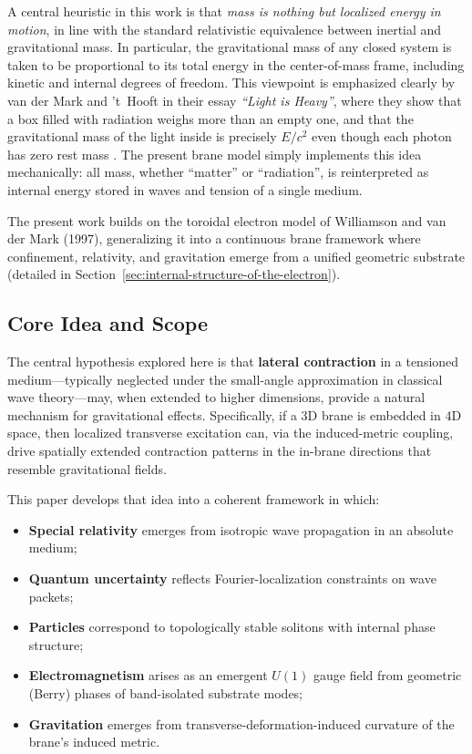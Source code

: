 A central heuristic in this work is that \emph{mass is nothing but
localized energy in motion}, in line with the standard relativistic
equivalence between inertial and gravitational mass. In particular, the
gravitational mass of any closed system is taken to be proportional to
its total energy in the center-of-mass frame, including kinetic and
internal degrees of freedom. This viewpoint is emphasized clearly by
van der Mark and 't~Hooft in their essay \emph{``Light is Heavy''},
where they show that a box filled with radiation weighs more than an
empty one, and that the gravitational mass of the light inside is
precisely $E/c^2$ even though each photon has zero rest mass
\cite{vanderMark2000LightHeavy}. The present brane model simply
implements this idea mechanically: all mass, whether ``matter'' or
``radiation'', is reinterpreted as internal energy stored in waves and
tension of a single medium.

The present work builds on the toroidal electron model of Williamson and van der Mark (1997), generalizing it into a continuous brane framework where confinement, relativity, and gravitation emerge from a unified geometric substrate (detailed in Section~\ref{sec:internal-structure-of-the-electron}).

\subsection{Core Idea and Scope}\label{core-idea}

The central hypothesis explored here is that \textbf{lateral contraction} in a tensioned medium—typically neglected under the small-angle approximation in classical wave theory—may, when extended to higher dimensions, provide a natural mechanism for gravitational effects. Specifically, if a 3D brane is embedded in 4D space, then localized transverse excitation can, via the induced-metric coupling, drive spatially extended contraction patterns in the in-brane directions that resemble gravitational fields.

This paper develops that idea into a coherent framework in which:
\begin{itemize}
\item \textbf{Special relativity} emerges from isotropic wave propagation in an absolute medium;
\item \textbf{Quantum uncertainty} reflects Fourier-localization constraints on wave packets;
\item \textbf{Particles} correspond to topologically stable solitons with internal phase structure;
\item \textbf{Electromagnetism} arises as an emergent $U(1)$ gauge field from geometric (Berry) phases of band-isolated substrate modes;
\item \textbf{Gravitation} emerges from transverse-deformation-induced curvature of the brane's induced metric.
\end{itemize}

